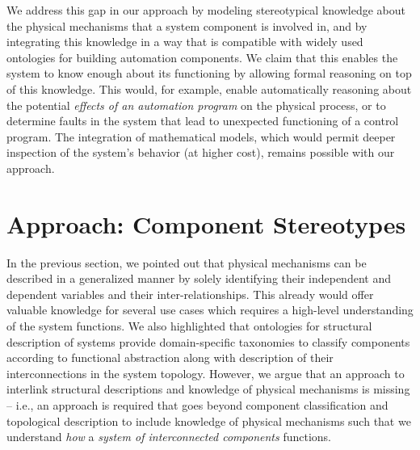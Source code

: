 \documentclass[sigconf]{acmart}
\begin{document}

We address this gap in our approach by modeling stereotypical knowledge about the physical mechanisms that a system component is involved in, and by integrating this knowledge in a way that is compatible with widely used ontologies for building automation components.
We claim that this enables the system to know enough about its functioning by allowing formal reasoning on top of this knowledge. This would, for example, enable automatically reasoning about the potential \textit{effects of an automation program} on the physical process, or to determine faults in the system that lead to unexpected functioning of a control program. The integration of mathematical models, which would permit deeper inspection of the system's behavior (at higher cost), remains possible with our approach.



\section{Approach: Component Stereotypes}
\label{sec:approach}

In the previous section, we pointed out that physical mechanisms can be described in a generalized manner by solely identifying their independent and dependent variables and their inter-relationships.
This already would offer valuable knowledge for several use cases which requires a high-level understanding of the system functions.
%
We also highlighted that ontologies for structural description of systems provide domain-specific taxonomies to classify components according to functional abstraction along with description of their interconnections in the system topology.
%
However, we argue that an approach to interlink structural descriptions and knowledge of physical mechanisms is missing -- i.e., an approach is required that goes beyond component classification and topological description to include knowledge of physical mechanisms such that we understand \textit{how} a \emph{system of interconnected components} functions. 
\end{document}
